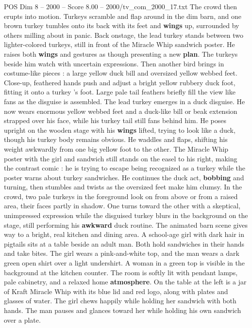 \begin{textsample}{POS Dim 8 – 2000 – Score 8.00 – 2000/tv\_com\_2000\_17.txt}
The crowd then erupts into motion.
Turkeys scramble and flap around in the dim barn, and one brown turkey tumbles onto its back with its feet and \textbf{wings} up, surrounded by others milling about in panic.
Back onstage, the lead turkey stands between two lighter-colored turkeys, still in front of the Miracle Whip sandwich poster.
He raises both \textbf{wings} and gestures as though presenting a new \textbf{plan}.
The turkeys beside him watch with uncertain expressions.
Then another bird brings in costume-like pieces : a large yellow duck bill and oversized yellow webbed feet.
Close-up, feathered hands push and adjust a bright yellow rubbery duck foot, fitting it onto a turkey ’s foot.
Large pale tail feathers briefly fill the view like fans as the disguise is assembled.
The lead turkey emerges in a duck disguise.
He now wears enormous yellow webbed feet and a duck-like bill or beak extension strapped over his face, while his turkey tail still fans behind him.
He poses upright on the wooden stage with his \textbf{wings} lifted, trying to look like a duck, though his turkey body remains obvious.
He waddles and flaps, shifting his weight awkwardly from one big yellow foot to the other.
The Miracle Whip poster with the girl and sandwich still stands on the easel to his right, making the contrast comic : he is trying to escape being recognized as a turkey while the poster warns about turkey sandwiches.
He continues the duck act, \textbf{bobbing} and turning, then stumbles and twists as the oversized feet make him clumsy.
In the crowd, two pale turkeys in the foreground look on from above or from a raised area, their faces partly in shadow.
One turns toward the other with a skeptical, unimpressed expression while the disguised turkey blurs in the background on the stage, still performing his \textbf{awkward} duck routine.
The animated barn scene gives way to a bright, real kitchen and dining area.
A school-age girl with dark hair in pigtails sits at a table beside an adult man.
Both hold sandwiches in their hands and take bites.
The girl wears a pink-and-white top, and the man wears a dark green open shirt over a light undershirt.
A woman in a green top is visible in the background at the kitchen counter.
The room is softly lit with pendant lamps, pale cabinetry, and a relaxed home \textbf{atmosphere}.
On the table at the left is a jar of Kraft Miracle Whip with its blue lid and red logo, along with plates and glasses of water.
The girl chews happily while holding her sandwich with both hands.
The man pauses and glances toward her while holding his own sandwich over a plate.

\end{textsample}
